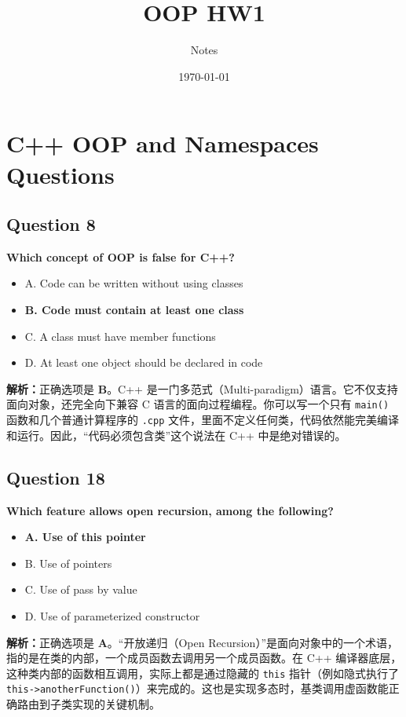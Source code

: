 \documentclass[11pt, a4paper]{article}
\title{OOP HW1}
\author{Notes}
\date{\today}
\begin{document}
\maketitle
\section{C++ OOP and Namespaces Questions}

\subsection*{Question 8}
\textbf{Which concept of OOP is false for C++?}
\begin{itemize}
    \item A. Code can be written without using classes
    \item \textbf{B. Code must contain at least one class}
    \item C. A class must have member functions
    \item D. At least one object should be declared in code
\end{itemize}

\textbf{解析：}正确选项是 \textbf{B}。C++ 是一门多范式（Multi-paradigm）语言。它不仅支持面向对象，还完全向下兼容 C 语言的面向过程编程。你可以写一个只有 \texttt{main()} 函数和几个普通计算程序的 \texttt{.cpp} 文件，里面不定义任何类，代码依然能完美编译和运行。因此，“代码必须包含类”这个说法在 C++ 中是绝对错误的。


\subsection*{Question 18}
\textbf{Which feature allows open recursion, among the following?}
\begin{itemize}
    \item \textbf{A. Use of this pointer}
    \item B. Use of pointers
    \item C. Use of pass by value
    \item D. Use of parameterized constructor
\end{itemize}

\textbf{解析：}正确选项是 \textbf{A}。“开放递归（Open Recursion）”是面向对象中的一个术语，指的是在类的内部，一个成员函数去调用另一个成员函数。在 C++ 编译器底层，这种类内部的函数相互调用，实际上都是通过隐藏的 \texttt{this} 指针（例如隐式执行了 \texttt{this->anotherFunction()}）来完成的。这也是实现多态时，基类调用虚函数能正确路由到子类实现的关键机制。
\end{document}
